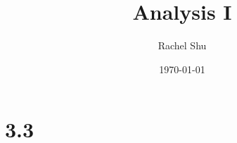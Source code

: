 \documentclass{article}
\title{Analysis I}
\author{Rachel Shu}
\date{\today}
\begin{document}
\maketitle

\chapter{3.3}


\end{document}
